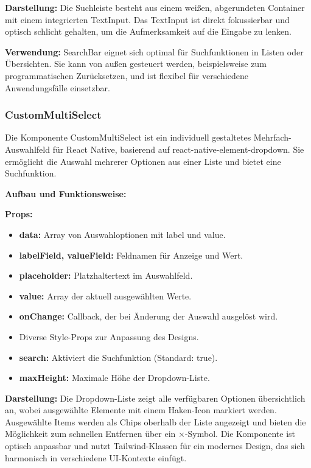\documentclass[12pt, a4paper]{report} %
\begin{document}
\textbf{Darstellung:}
Die Suchleiste besteht aus einem weißen, abgerundeten Container mit einem integrierten TextInput. Das TextInput ist direkt fokussierbar und optisch schlicht gehalten, um die Aufmerksamkeit auf die Eingabe zu lenken.

\noindent\textbf{Verwendung:} SearchBar eignet sich optimal für Suchfunktionen in Listen oder Übersichten. Sie kann von außen gesteuert werden, beispielsweise zum programmatischen Zurücksetzen, und ist flexibel für verschiedene Anwendungsfälle einsetzbar.

\subsubsection{CustomMultiSelect}
Die Komponente CustomMultiSelect ist ein individuell gestaltetes Mehrfach-Auswahlfeld für React Native, basierend auf react-native-element-dropdown. Sie ermöglicht die Auswahl mehrerer Optionen aus einer Liste und bietet eine Suchfunktion.

\noindent\textbf{Aufbau und Funktionsweise:}

\textbf{Props:}
\begin{itemize}
    \item \textbf{data:} Array von Auswahloptionen mit label und value.
    \item \textbf{labelField, valueField:} Feldnamen für Anzeige und Wert.
    \item \textbf{placeholder:} Platzhaltertext im Auswahlfeld.
    \item \textbf{value:} Array der aktuell ausgewählten Werte.
    \item \textbf{onChange:} Callback, der bei Änderung der Auswahl ausgelöst wird.
    \item Diverse Style-Props zur Anpassung des Designs.
    \item \textbf{search:} Aktiviert die Suchfunktion (Standard: true).
    \item \textbf{maxHeight:} Maximale Höhe der Dropdown-Liste.
\end{itemize}

\textbf{Darstellung:}
Die Dropdown-Liste zeigt alle verfügbaren Optionen übersichtlich an, wobei ausgewählte Elemente mit einem Haken-Icon markiert werden. Ausgewählte Items werden als Chips oberhalb der Liste angezeigt und bieten die Möglichkeit zum schnellen Entfernen über ein ×-Symbol. Die Komponente ist optisch anpassbar und nutzt Tailwind-Klassen für ein modernes Design, das sich harmonisch in verschiedene UI-Kontexte einfügt.
\end{document}
